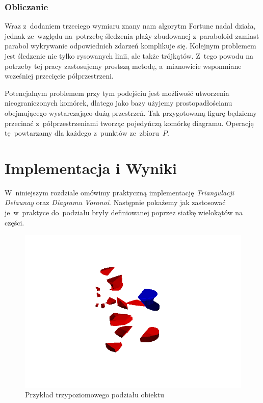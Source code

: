 \documentclass[skorowidz,autorrok,backref,xodstep,oswiadczenie]{wmimgr}
\begin{document}
\subsection{Obliczanie}

Wraz z~dodaniem trzeciego wymiaru znany nam algorytm Fortune nadal działa, jednak ze~względu na~potrzebę śledzenia plaży zbudowanej z~paraboloid zamiast parabol wykrywanie odpowiednich zdarzeń komplikuje się. Kolejnym problemem jest śledzenie nie tylko rysowanych linii, ale także trójkątów. Z~tego powodu na potrzeby tej pracy zastosujemy prostszą metodę, a~mianowicie wspomniane wcześniej przecięcie półprzestrzeni.

Potencjalnym problemem przy tym podejściu jest możliwość utworzenia nieograniczonych komórek, dlatego jako bazy użyjemy prostopadłościanu obejmującego wystarczająco dużą przestrzeń. Tak przygotowaną figurę będziemy przecinać z~półprzestrzeniami tworząc pojedyńczą komórkę diagramu. Operację tę~powtarzamy dla każdego z~punktów ze~zbioru~$P$.

\chapter{Implementacja i Wyniki}

W~niniejszym rozdziale omówimy praktyczną implementację \emph{Triangulacji Delaunay} oraz \emph{Diagramu Voronoi}. Następnie pokażemy jak zastosować je~w~praktyce do~podziału bryły definiowanej poprzez siatkę wielokątów na części.

\begin{figure}[ht!]
\centering
\includegraphics[width=140mm]{images/app4.png}
\caption{Przykład trzypoziomowego podziału obiektu}
\label{appdivisionlevels}
\end{figure}
\end{document}
